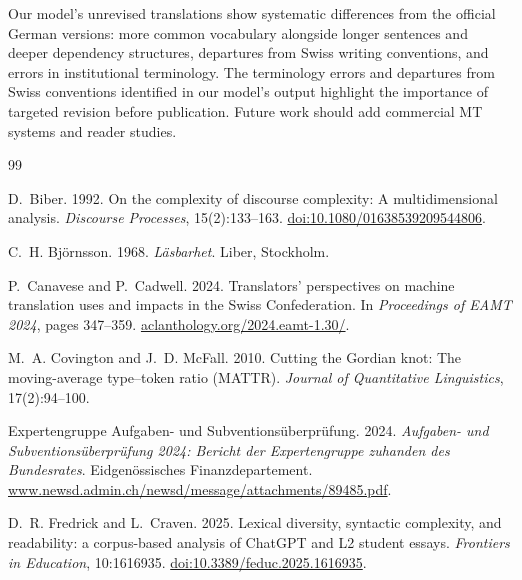 \documentclass[11pt,a4paper]{article}
\begin{document}
Our model's unrevised translations show systematic differences from the official German versions: more common vocabulary alongside longer sentences and deeper dependency structures, departures from Swiss writing conventions, and errors in institutional terminology. The terminology errors and departures from Swiss conventions identified in our model's output highlight the importance of targeted revision before publication. Future work should add commercial MT systems and reader studies.


\begin{thebibliography}{99}
\setlength{\itemsep}{1pt}
\small

D.~Biber. 1992. On the complexity of discourse complexity: A multidimensional
analysis. \emph{Discourse Processes}, 15(2):133--163.
\href{https://doi.org/10.1080/01638539209544806}{doi:10.1080/01638539209544806}.

C.~H. Bj{\"o}rnsson. 1968. \emph{L{\"a}sbarhet}. Liber, Stockholm.

P.~Canavese and P.~Cadwell. 2024. Translators' perspectives on machine
translation uses and impacts in the Swiss Confederation. In \emph{Proceedings of
EAMT 2024}, pages 347--359. \href{https://aclanthology.org/2024.eamt-1.30/}{aclanthology.org/2024.eamt-1.30/}.

M.~A. Covington and J.~D. McFall. 2010. Cutting the Gordian knot: The
moving-average type--token ratio (MATTR). \emph{Journal of Quantitative
Linguistics}, 17(2):94--100.

Expertengruppe Aufgaben- und Subventions\"uberpr\"ufung. 2024.
\emph{Aufgaben- und Subventions\"uberpr\"ufung 2024: Bericht der Expertengruppe
zuhanden des Bundesrates}. Eidgen\"ossisches Finanzdepartement.
\href{https://www.newsd.admin.ch/newsd/message/attachments/89485.pdf}{www.newsd.admin.ch/newsd/message/attachments/89485.pdf}.

D.~R. Fredrick and L.~Craven. 2025. Lexical diversity, syntactic complexity, and
readability: a corpus-based analysis of ChatGPT and L2 student essays.
\emph{Frontiers in Education}, 10:1616935. \href{https://doi.org/10.3389/feduc.2025.1616935}{doi:10.3389/feduc.2025.1616935}.


\end{thebibliography}
\end{document}
